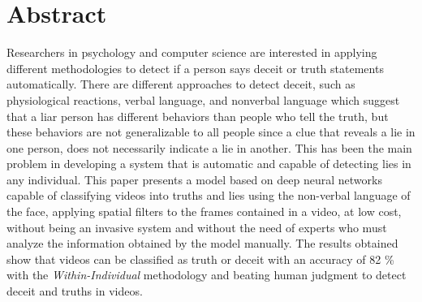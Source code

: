 \chapter*{\centering Abstract}

Researchers in psychology and computer science are interested in applying different methodologies to detect if a person says deceit or truth statements automatically.
There are different approaches to detect deceit, such as physiological reactions, verbal language, and nonverbal language which suggest that a liar person has different behaviors than people who tell the truth, but these behaviors are not generalizable to all people since a clue that reveals a lie in one person, does not necessarily indicate a lie in another. This has been the main problem in developing a system that is automatic and capable of detecting lies in any individual.
This paper presents a model based on deep neural networks capable of classifying videos into truths and lies using the non-verbal language of the face, applying spatial filters to the frames contained in a video, at low cost, without being an invasive system and without the need of experts who must analyze the information obtained by the model manually.
The results obtained show that videos can be classified as truth or deceit with an accuracy of 82 \% with the \textit{Within-Individual} methodology and beating human judgment to detect deceit and truths in videos.\\